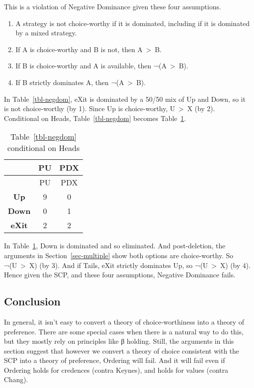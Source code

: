 \documentclass[
  10pt,
  letterpaper,
  DIV=11,
  numbers=noendperiod,
  twoside]{scrartcl}
\providecommand{\tightlist}{%
  \setlength{\itemsep}{0pt}\setlength{\parskip}{0pt}}\usepackage{longtable,booktabs,array}
\begin{document}
This is a violation of Negative Dominance given these four assumptions.

\begin{enumerate}
\def\labelenumi{\arabic{enumi}.}
\tightlist
\item
  A strategy is not choice-worthy if it is dominated, including if it is
  dominated by a mixed strategy.
\item
  If A is choice-worthy and B is not, then A~\textgreater~B.
\item
  If B is choice-worthy and A is available, then ¬(A~\textgreater~B).
\item
  If B strictly dominates A, then ¬(A~\textgreater~B).
\end{enumerate}

In Table~\ref{tbl-negdom}, eXit is dominated by a 50/50 mix of Up and
Down, so it is not choice-worthy (by 1). Since Up is choice-worthy,
U~\textgreater~X (by 2). Conditional on Heads, Table~\ref{tbl-negdom}
becomes Table~\ref{tbl-negdom-heads}.

\begin{longtable}[]{@{}ccc@{}}
\caption{Table~\ref{tbl-negdom} conditional on
Heads}\label{tbl-negdom-heads}\tabularnewline
\toprule\noalign{}
& PU & PDX \\
\midrule\noalign{}
\endfirsthead
\toprule\noalign{}
& PU & PDX \\
\midrule\noalign{}
\endhead
\bottomrule\noalign{}
\endlastfoot
\textbf{Up} & 9 & 0 \\
\textbf{Down} & 0 & 1 \\
\textbf{eXit} & 2 & 2 \\
\end{longtable}

In Table~\ref{tbl-negdom-heads}, Down is dominated and so eliminated.
And post-deletion, the arguments in Section~\ref{sec-multiple} show both
options are choice-worthy. So ¬(U~\textgreater~X) (by 3). And if Tails,
eXit strictly dominates Up, so ¬(U~\textgreater~X) (by 4). Hence given
the SCP, and these four assumptions, Negative Dominance fails.

\subsection{Conclusion}\label{sec-conclusion}

In general, it isn't easy to convert a theory of choice-worthiness into
a theory of preference. There are some special cases when there is a
natural way to do this, but they mostly rely on principles like β
holding. Still, the arguments in this section suggest that however we
convert a theory of choice consistent with the SCP into a theory of
preference, Ordering will fail. And it will fail even if Ordering holds
for credences (contra Keynes), and holds for values (contra Chang).
\end{document}
